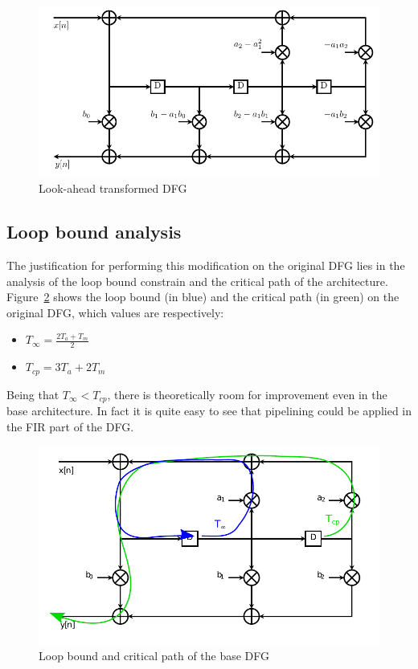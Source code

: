 \documentclass[a4paper]{article}
\begin{document}
\begin{figure}[hbtp]
    \centering
    \includegraphics[width=.9\linewidth]{media/lookahead_dfg.pdf}
    \caption{Look-ahead transformed DFG}
    \label{fig:lookahead_dfg}
\end{figure}

\subsection{Loop bound analysis}
The justification for performing this modification on the original DFG lies in the analysis of the loop bound constrain and the critical path of the architecture. Figure~\ref{fig:base_dfg_lbcp} shows the loop bound (in blue) and the critical path (in green) on the original DFG, which values are respectively:
\begin{itemize}
    \item $T_\infty = \frac{2T_a + T_m}{2}$
    \item $T_{cp} = 3T_a + 2T_m$
\end{itemize}
Being that $T_\infty < T_{cp}$, there is theoretically room for improvement even in the base architecture. In fact it is quite easy to see that pipelining could be applied in the FIR part of the DFG.

\begin{figure}[hbtp]
    \centering
    \includegraphics[width=.8\linewidth]{media/base_dfg_lbcp.pdf}
    \caption{Loop bound and critical path of the base DFG}
    \label{fig:base_dfg_lbcp}
\end{figure}
\end{document}
